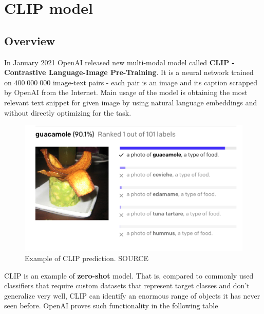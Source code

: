 \documentclass[12pt,a4paper,openany]{book}
\begin{document}

\section{CLIP model}
\subsection{Overview}
\noindent In January 2021 OpenAI released new multi-modal model called \textbf{CLIP - Contrastive Language-Image Pre-Training}.  It is a neural network trained on $400 \;000 \;000$ image-text pairs - each pair is an image and its caption scrapped by OpenAI from the Internet. Main usage of the model is obtaining the most relevant text snippet for given image by using natural language embeddings and without directly optimizing for the task.
 \begin{figure}[ht!]
     \centering
     \includegraphics[scale=0.6]{figs/clip_example.png}
     \caption{Example of CLIP prediction. SOURCE}
 \end{figure}
\noindent CLIP is an example of \textbf{zero-shot} model.  That is, compared to commonly used classifiers that require custom datasets that represent target classes and don't generalize very well, CLIP can identify an enormous range of objects it has never seen before. OpenAI proves such functionality in the following table
\newline
\end{document}
